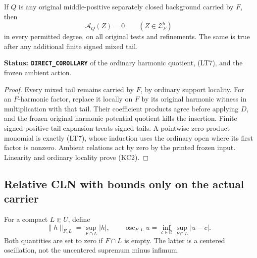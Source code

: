 \begin{lemma}
\label{lem:r12-finite-carrier-certificate}
If \(Q\) is any original middle-positive separately closed
background carried by \(F\), then
\[
                              \mathcal A_Q(Z)=0
                              \qquad(Z\in\mathcal Z_F^b)
 \tag{KC2}
\]
in every permitted degree, on all original tests and refinements.
The same is true after any additional finite signed mixed tail.
\end{lemma}

\noindent\textbf{Status: \texttt{DIRECT\_COROLLARY}} of the
ordinary harmonic quotient, (LT7), and the frozen ambient action.

\begin{proof}
Every mixed tail remains carried by \(F\), by ordinary support
locality. For an \(F\)-harmonic factor, replace it locally on \(F\)
by its original harmonic witness in multiplication with that tail.
Their coefficient products agree before applying \(D\), and the
frozen original harmonic potential quotient kills the insertion.
Finite signed positive-tail expansion treats signed tails. A
pointwise zero-product monomial is exactly (LT7), whose induction
uses the ordinary open where its first factor is nonzero.
Ambient relations act by zero by the printed frozen input.
Linearity and ordinary locality prove (KC2).
\end{proof}

\subsection{Relative CLN with bounds only on the actual carrier}

For a compact \(L\Subset U\), define
\[
 \|h\|_{F,L}=\sup_{F\cap L}|h|,\qquad
 \operatorname{osc}_{F,L}u
          =\inf_{c\in\mathbb R}\sup_{F\cap L}|u-c|.
 \tag{KC3}
\]
Both quantities are set to zero if \(F\cap L\) is empty.
The latter is a centered oscillation, not the uncentered
supremum minus infimum.

